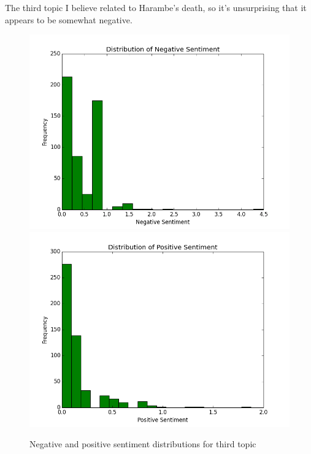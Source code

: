 \documentclass{article}
\begin{document}
\begin{enumerate}
		The third topic I believe related to Harambe's death, so it's unsurprising that it appears to be somewhat negative.
		\begin{figure}[H]
			\includegraphics[scale=0.35]{2neg.png}
			\includegraphics[scale=0.35]{2pos.png}
			\begin{center}
			\caption{Negative and positive sentiment distributions for third topic}
			\end{center}
		\end{figure}		
		

\end{enumerate}
\end{document}
